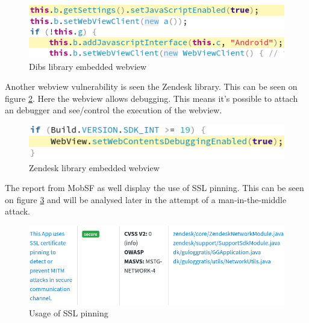 \begin{figure}[htbp]
    \centering
    \includegraphics[width=1\columnwidth]{../static-analysis/pictures/dibs-javascript.png}
    \caption{Dibs library embedded webview}
    \label{fig:dibs-webview}
\end{figure}

Another webview vulnerability is seen the Zendesk library. This can be seen on figure \ref{fig:zendesk-webview}. Here the webview allows debugging. This means it's possible to attach an debugger and see/control the execution of the webview.    

\begin{figure}[htbp]
    \centering
    \includegraphics[width=1\columnwidth]{../static-analysis/pictures/zendesk-webview.png}
    \caption{Zendesk library embedded webview}
    \label{fig:zendesk-webview}
\end{figure}

The report from MobSF as well display the use of SSL pinning. This can be seen on figure \ref{fig:ssl-pinning} and will be analysed later in the attempt of a man-in-the-middle attack. 

\begin{figure}[htbp]
    \centering
    \includegraphics[width=1\columnwidth]{../static-analysis/pictures/ssl-pinning.png}
    \caption{Usage of SSL pinning}
    \label{fig:ssl-pinning}
\end{figure}

